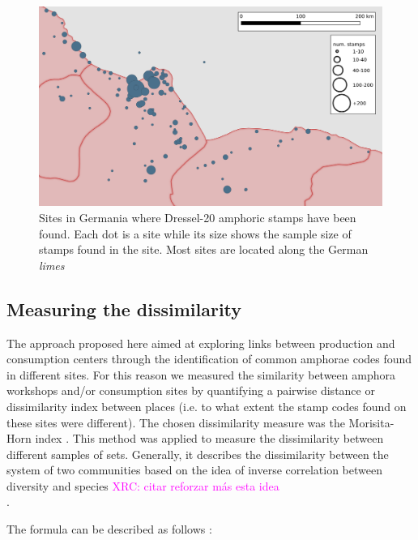 \documentclass[review]{elsarticle}
\newcommand{\memo}[2]{\textcolor{#1}{#2}}
\newcommand{\xavi}[1]{\memo{magenta}{XRC: #1\\}}
\begin{document}
\begin{figure}[htp]
	\centering
\includegraphics[width=\linewidth]{figs/germania}
\caption{Sites in Germania where Dressel-20 amphoric stamps have been found. Each dot is a site while its size shows the sample size of stamps found in the site. Most sites are located along the German \textit{limes}}
\label{germania}
\end{figure}


\subsection{Measuring the dissimilarity}



The approach proposed here aimed at exploring links between production and consumption centers through the identification of common amphorae codes found in different sites. For this reason we measured the similarity between amphora workshops and/or consumption sites by quantifying a pairwise distance or dissimilarity index between places (i.e. to what extent the stamp codes found on these sites were different). The chosen dissimilarity measure was the Morisita-Horn index \citep{morisita_measuring_1959, horn_measurement_1966}. This method was applied to measure the dissimilarity between different samples of sets. Generally, it describes the dissimilarity between the system of two communities based on the idea of inverse correlation between diversity and species \citep{magurran_why_1988}\xavi{citar reforzar más esta idea}.

The formula can be described as follows \citep{magurran_measuring_2013}:
\end{document}
